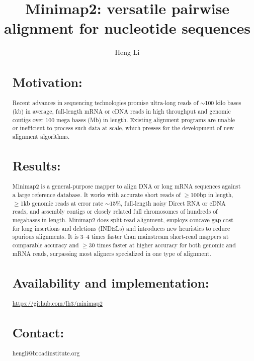 \documentclass{bioinfo}
\begin{document}

\title[Aligning nucleotide sequences with minimap2]{Minimap2: versatile pairwise alignment for nucleotide sequences}
\author[Li]{Heng Li}
\address{Broad Institute, 415 Main Street, Cambridge, MA 02142, USA}

\maketitle

\begin{abstract}

\section{Motivation:} Recent advances in sequencing technologies promise
ultra-long reads of $\sim$100 kilo bases (kb) in average, full-length mRNA or
cDNA reads in high throughput and genomic contigs over 100 mega bases (Mb) in
length. Existing alignment programs are unable or inefficient to process such data
at scale, which presses for the development of new alignment algorithms.

\section{Results:} Minimap2 is a general-purpose mapper to align DNA or long
mRNA sequences against a large reference database. It works with accurate short
reads of $\ge$100bp in length, $\ge$1kb genomic reads at error rate $\sim$15\%,
full-length noisy Direct RNA or cDNA reads, and assembly contigs or closely
related full chromosomes of hundreds of megabases in length. Minimap2 does
split-read alignment, employs concave gap cost for long insertions and
deletions (INDELs) and introduces new heuristics to reduce spurious alignments.
It is 3--4 times faster than mainstream short-read mappers at comparable
accuracy and $\ge$30 times faster at higher accuracy for both genomic and mRNA
reads, surpassing most aligners specialized in one type of alignment.

\section{Availability and implementation:}
\href{https://github.com/lh3/minimap2}{https://github.com/lh3/minimap2}

\section{Contact:} hengli@broadinstitute.org
\end{abstract}
\end{document}
